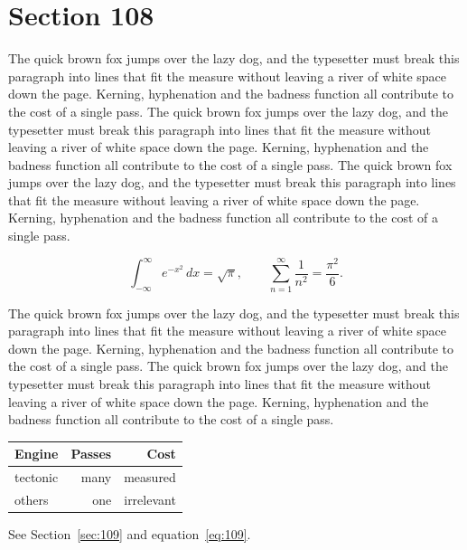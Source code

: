 \documentclass{article}
\begin{document}
\section{Section 108}
\label{sec:108}
The quick brown fox jumps over the lazy dog, and the typesetter must break this paragraph into lines that fit the measure without leaving a river of white space down the page. Kerning, hyphenation and the badness function all contribute to the cost of a single pass. The quick brown fox jumps over the lazy dog, and the typesetter must break this paragraph into lines that fit the measure without leaving a river of white space down the page. Kerning, hyphenation and the badness function all contribute to the cost of a single pass. The quick brown fox jumps over the lazy dog, and the typesetter must break this paragraph into lines that fit the measure without leaving a river of white space down the page. Kerning, hyphenation and the badness function all contribute to the cost of a single pass. 

\begin{equation}\label{eq:108}
\int_{-\infty}^{\infty} e^{-x^{2}}\,dx = \sqrt{\pi}, \qquad
\sum_{n=1}^{\infty} \frac{1}{n^{2}} = \frac{\pi^{2}}{6}.
\end{equation}

The quick brown fox jumps over the lazy dog, and the typesetter must break this paragraph into lines that fit the measure without leaving a river of white space down the page. Kerning, hyphenation and the badness function all contribute to the cost of a single pass. The quick brown fox jumps over the lazy dog, and the typesetter must break this paragraph into lines that fit the measure without leaving a river of white space down the page. Kerning, hyphenation and the badness function all contribute to the cost of a single pass. 

\begin{center}
\begin{tabular}{lrr}
\toprule
Engine & Passes & Cost \\
\midrule
tectonic & many & measured \\
others & one & irrelevant \\
\bottomrule
\end{tabular}
\end{center}

See Section~\ref{sec:109} and equation~\eqref{eq:109}.
\end{document}

